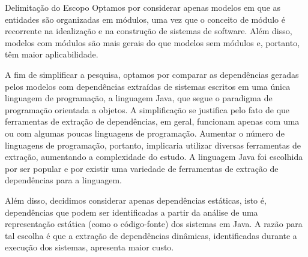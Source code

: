 \begin{section}{Delimitação do Escopo}
	Optamos por considerar apenas modelos em que as entidades são organizadas em módulos, uma vez que o conceito de módulo é recorrente na idealização e na construção de sistemas de software. Além disso, modelos com módulos são mais gerais do que modelos sem módulos e, portanto, têm maior aplicabilidade.
		
	A fim de simplificar a pesquisa, optamos por comparar as dependências geradas pelos modelos com dependências extraídas de sistemas escritos em uma única linguagem de programação, a linguagem Java, que segue o paradigma de programação orientada a objetos. A simplificação se justifica pelo fato de que ferramentas de extração de dependências, em geral, funcionam apenas com uma ou com algumas poucas linguagens de programação. Aumentar o número de linguagens de programação, portanto, implicaria utilizar diversas ferramentas de extração, aumentando a complexidade do estudo. A linguagem Java foi escolhida por ser popular e por existir uma variedade de ferramentas de extração de dependências para a linguagem.
	
	Além disso, decidimos considerar apenas dependências estáticas, isto é, dependências que podem ser identificadas a partir da análise de uma representação estática (como o código-fonte) dos sistemas em Java. A razão para tal escolha é que a extração de dependências dinâmicas, identificadas durante a execução dos sistemas, apresenta maior custo.

\end{section}

